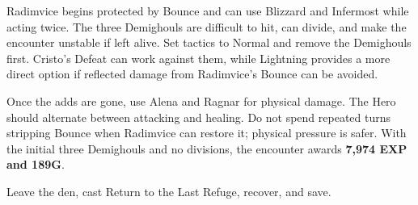\documentclass[
  american,
  10pt,
  letterpaper,
  oneside,
  open=any]{scrreprt}
\begin{document}
Radimvice begins protected by Bounce and can use Blizzard and Infermost
while acting twice. The three Demighouls are difficult to hit, can
divide, and make the encounter unstable if left alive. Set tactics to
Normal and remove the Demighouls first. Cristo's Defeat can work against
them, while Lightning provides a more direct option if reflected damage
from Radimvice's Bounce can be avoided.

Once the adds are gone, use Alena and Ragnar for physical damage. The
Hero should alternate between attacking and healing. Do not spend
repeated turns stripping Bounce when Radimvice can restore it; physical
pressure is safer. With the initial three Demighouls and no divisions,
the encounter awards \textbf{7,974 EXP and 189G}.

Leave the den, cast Return to the Last Refuge, recover, and save.
\end{document}
